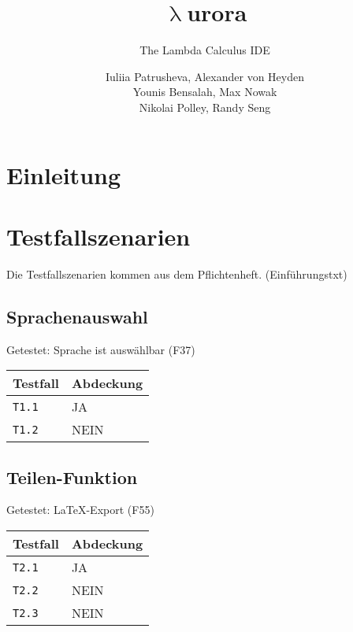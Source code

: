 \documentclass[parskip=full,11pt,twoside]{scrartcl}
\title{\textbf{$\uplambda$}urora}
\subtitle{The Lambda Calculus IDE}
\author{Iuliia Patrusheva, Alexander von Heyden\\
    Younis Bensalah, Max Nowak\\
    Nikolai Polley, Randy Seng}
\begin{document}
\maketitle
\tableofcontents
\newpage

\section{Einleitung}


\section{Testfallszenarien}
    Die Testfallszenarien kommen aus dem Pflichtenheft. (Einführungstxt)
    
\subsection{Sprachenauswahl}
    Getestet:
    Sprache ist auswählbar (F37)

    \label{shortcuts}
    \begin{center}
        \begin{tabular}{ p{9cm} p{4cm}}
            Testfall & Abdeckung \\ \hline
            \texttt{T1.1} & \cellcolor{green!20}JA \\ \hline
            \texttt{T1.2} & \cellcolor{red!20}NEIN \\ \hline
        \end{tabular}
    \end{center}

\subsection{Teilen-Funktion}
    Getestet:
    LaTeX-Export (F55)
    
    \label{shortcuts}
    \begin{center}
        \begin{tabular}{ p{9cm} p{4cm}}
            Testfall & Abdeckung \\ \hline
            \texttt{T2.1} & \cellcolor{green!20}JA \\ \hline
            \texttt{T2.2} & \cellcolor{red!20}NEIN \\ \hline
            \texttt{T2.3} & \cellcolor{red!20}NEIN \\ \hline
        \end{tabular}
    \end{center}
\end{document}
